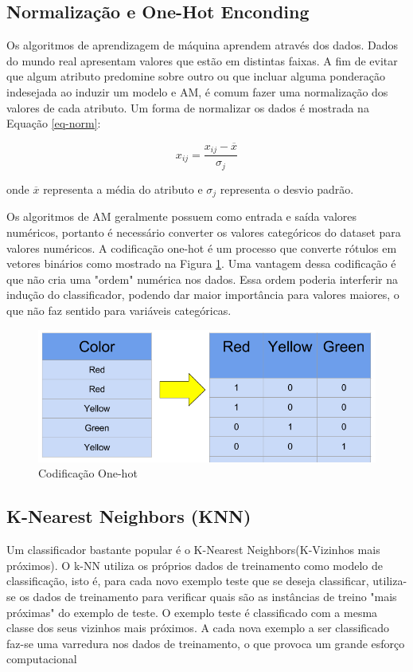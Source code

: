 \subsection{Normalização e One-Hot Enconding}
Os algoritmos de aprendizagem de máquina aprendem através dos dados. Dados do mundo real apresentam valores que estão em distintas faixas. A fim de evitar que algum atributo predomine sobre outro ou que incluar alguma ponderação indesejada ao induzir um modelo e AM, é comum fazer uma normalização dos valores de cada atributo. Um forma de normalizar os dados é mostrada na Equação \ref{eq-norm}:

\begin{equation}\label{eq-norm}
x_{ij} = \frac{x_{ij} - \overline{x}}{ \sigma_j}
\end{equation}

onde $\overline{x}$ representa a média do atributo e $\sigma_j$ representa o desvio padrão.

Os algoritmos de AM geralmente possuem como entrada e saída valores numéricos, portanto é necessário converter os valores categóricos do dataset para valores numéricos. A codificação one-hot é um processo que converte rótulos em vetores binários como mostrado na Figura \ref{fig-onehot}. Uma vantagem dessa codificação é que não cria uma "ordem" numérica nos dados. Essa ordem poderia interferir na indução do classificador, podendo dar maior importância para valores maiores, o que não faz sentido para variáveis categóricas.

\begin{figure}[h]
	\centering
	\includegraphics[scale=0.5]{pasta1_figuras/one-hot.png}
	\caption{Codificação One-hot}
	\label{fig-onehot}
\end{figure}

\subsection{K-Nearest Neighbors (KNN)}
Um classificador bastante popular é o K-Nearest Neighbors(K-Vizinhos mais próximos). O k-NN utiliza os próprios dados de treinamento como modelo de classificação, isto é, para cada novo exemplo teste que se deseja classificar, utiliza-se os dados de treinamento para verificar  quais são as instâncias de treino "mais próximas" do exemplo de teste. O exemplo teste é classificado com a mesma classe dos seus vizinhos mais próximos. A cada nova exemplo a ser classificado faz-se uma varredura nos dados de treinamento, o que provoca um grande esforço computacional

